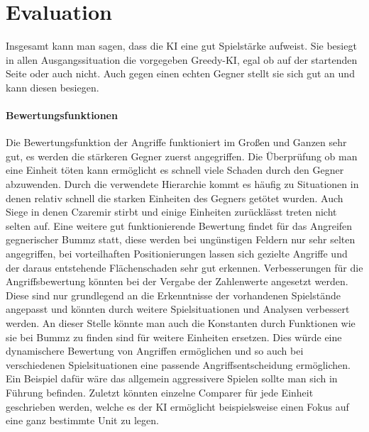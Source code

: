 

\chapter{Evaluation}

Insgesamt kann man sagen, dass die KI eine gut Spielstärke aufweist. Sie besiegt in allen Ausgangssituation die vorgegeben Greedy-KI, egal ob auf der startenden Seite oder auch nicht. Auch gegen einen echten Gegner stellt sie sich gut an und kann diesen besiegen. 

\subsubsection{Bewertungsfunktionen}

Die Bewertungsfunktion der Angriffe funktioniert im Großen und Ganzen sehr gut, es werden die stärkeren Gegner zuerst angegriffen. Die Überprüfung ob man eine Einheit töten kann ermöglicht es schnell viele Schaden durch den Gegner abzuwenden. Durch die verwendete Hierarchie kommt es häufig zu Situationen in denen relativ schnell die starken Einheiten des Gegners getötet wurden. Auch Siege in denen Czaremir stirbt und einige Einheiten zurücklässt treten nicht selten auf. Eine weitere gut funktionierende Bewertung findet für das Angreifen gegnerischer Bummz statt, diese werden bei ungünstigen Feldern nur sehr selten angegriffen, bei vorteilhaften Positionierungen lassen sich gezielte Angriffe und der daraus entstehende Flächenschaden sehr gut erkennen. 
Verbesserungen für die Angriffsbewertung könnten bei der Vergabe der Zahlenwerte angesetzt werden. Diese sind nur grundlegend an die Erkenntnisse der vorhandenen Spielstände angepasst und könnten durch weitere Spielsituationen und Analysen verbessert werden. An dieser Stelle könnte man auch die Konstanten durch Funktionen wie sie bei Bummz zu finden sind für weitere Einheiten ersetzen. Dies würde eine dynamischere Bewertung von Angriffen ermöglichen und so auch bei verschiedenen Spielsituationen eine passende Angriffsentscheidung ermöglichen. Ein Beispiel dafür wäre das allgemein aggressivere Spielen sollte man sich in Führung befinden. Zuletzt könnten einzelne Comparer für jede Einheit geschrieben werden, welche es der KI ermöglicht beispielsweise einen Fokus auf eine ganz bestimmte Unit zu legen. 

